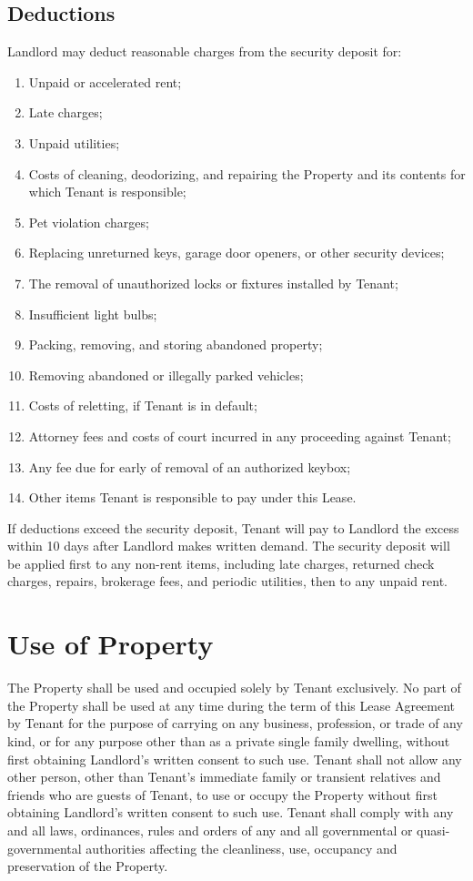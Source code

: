 \documentclass{amsart}
\begin{document}
\subsection{Deductions}
Landlord may deduct reasonable charges from the security deposit for:
\begin{enumerate}
    \item Unpaid or accelerated rent;
    \item Late charges;
    \item Unpaid utilities;
    \item Costs of cleaning, deodorizing, and repairing the Property and its contents for which Tenant is responsible;
    \item Pet violation charges;
    \item Replacing unreturned keys, garage door openers, or other security devices;
    \item The removal of unauthorized locks or fixtures installed by Tenant;
    \item Insufficient light bulbs;
    \item Packing, removing, and storing abandoned property;
    \item Removing abandoned or illegally parked vehicles;
    \item Costs of reletting, if Tenant is in default;
    \item Attorney fees and costs of court incurred in any proceeding against Tenant;
    \item Any fee due for early of removal of an authorized keybox;
    \item Other items Tenant is responsible to pay under this Lease.
\end{enumerate}
If deductions exceed the security deposit, Tenant will pay to Landlord the
excess within 10 days after Landlord makes written demand. The security deposit
will be applied first to any non-rent items, including late charges, returned
check charges, repairs, brokerage fees, and periodic utilities, then to any
unpaid rent.
\section{Use of Property}
The Property shall be used and occupied solely by Tenant exclusively.  No part
of the Property shall be used at any time during the term of this Lease
Agreement by Tenant for the purpose of carrying on any business, profession, or
trade of any kind, or for any purpose other than as a private single family
dwelling, without first obtaining Landlord's written consent to such use.
Tenant shall not allow any other person, other than Tenant's immediate family or
transient relatives and friends who are guests of Tenant, to use or occupy the
Property without first obtaining Landlord's written consent to such use. Tenant
shall comply with any and all laws, ordinances, rules and orders of any and all
governmental or quasi-governmental authorities affecting the cleanliness, use,
occupancy and preservation of the Property.
\end{document}
